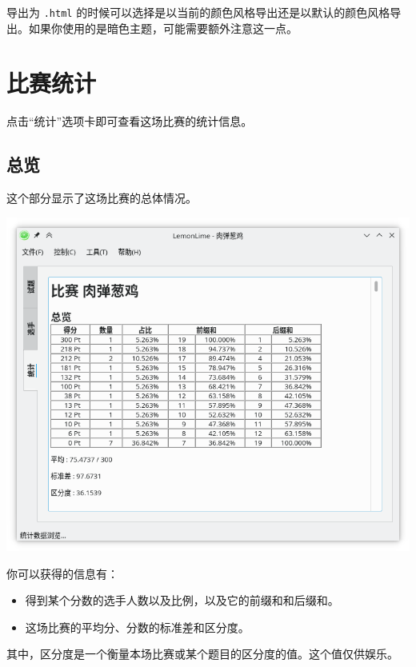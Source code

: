 \documentclass[UTF-8]{ctexart}
\begin{document}
		导出为 \texttt{.html} 的时候可以选择是以当前的颜色风格导出还是以默认的颜色风格导出。如果你使用的是暗色主题，可能需要额外注意这一点。
		
	\newpage
	
	\section{比赛统计}
	
		点击“统计”选项卡即可查看这场比赛的统计信息。
		
		\subsection{总览}
		
			这个部分显示了这场比赛的总体情况。
		
			\begin{center}
			\includegraphics[scale=0.5]{pics/statistics.png}
			\end{center}
		
			你可以获得的信息有：
			
			\begin{itemize}
				\item 得到某个分数的选手人数以及比例，以及它的前缀和和后缀和。
				\item 这场比赛的平均分、分数的标准差和区分度。
			\end{itemize}
		
			其中，区分度是一个衡量本场比赛或某个题目的区分度的值。这个值仅供娱乐。
			
\end{document}
